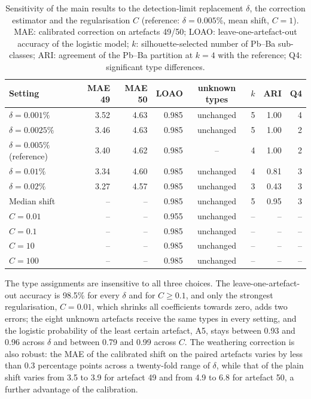 \documentclass[11pt,a4paper]{article}
\begin{document}
\begin{table}[ht]
\centering
\caption{Sensitivity of the main results to the detection-limit replacement $\delta$, the correction estimator and the regularisation $C$ (reference: $\delta=0.005\%$, mean shift, $C=1$). MAE: calibrated correction on artefacts 49/50; LOAO: leave-one-artefact-out accuracy of the logistic model; $k$: silhouette-selected number of Pb--Ba sub-classes; ARI: agreement of the Pb--Ba partition at $k=4$ with the reference; Q4: significant type differences.}\label{tab:sens}
\small
\begin{tabular}{lrrrcrrr}
\toprule
Setting & MAE 49 & MAE 50 & LOAO & unknown types & $k$ & ARI & Q4 \\
\midrule
$\delta=0.001\%$ & 3.52 & 4.63 & 0.985 & unchanged & 5 & 1.00 & 4 \\
$\delta=0.0025\%$ & 3.46 & 4.63 & 0.985 & unchanged & 5 & 1.00 & 2 \\
$\delta=0.005\%$ (reference) & 3.40 & 4.62 & 0.985 & -- & 4 & 1.00 & 2 \\
$\delta=0.01\%$ & 3.34 & 4.60 & 0.985 & unchanged & 4 & 0.81 & 3 \\
$\delta=0.02\%$ & 3.27 & 4.57 & 0.985 & unchanged & 3 & 0.43 & 3 \\
\addlinespace
Median shift & -- & -- & 0.985 & unchanged & 5 & 0.95 & 3 \\
\addlinespace
$C=0.01$ & -- & -- & 0.955 & unchanged & -- & -- & -- \\
$C=0.1$ & -- & -- & 0.985 & unchanged & -- & -- & -- \\
$C=10$ & -- & -- & 0.985 & unchanged & -- & -- & -- \\
$C=100$ & -- & -- & 0.985 & unchanged & -- & -- & -- \\
\bottomrule
\end{tabular}
\end{table}

The type assignments are insensitive to all three choices.
The leave-one-artefact-out accuracy is 98.5\% for every $\delta$ and for $C\ge0.1$, and only the strongest regularisation, $C=0.01$, which shrinks all coefficients towards zero, adds two errors; the eight unknown artefacts receive the same types in every setting, and the logistic probability of the least certain artefact, A5, stays between 0.93 and 0.96 across $\delta$ and between 0.79 and 0.99 across $C$.
The weathering correction is also robust: the MAE of the calibrated shift on the paired artefacts varies by less than 0.3 percentage points across a twenty-fold range of $\delta$, while that of the plain shift varies from 3.5 to 3.9 for artefact 49 and from 4.9 to 6.8 for artefact 50, a further advantage of the calibration.
\end{document}
